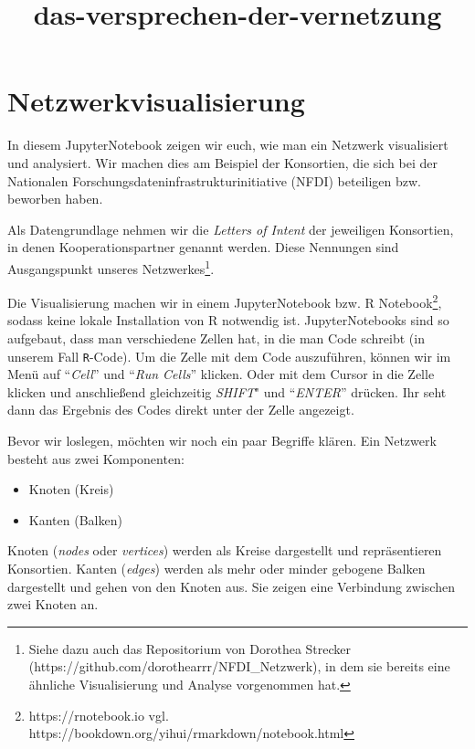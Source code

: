 \documentclass[11pt]{article}
\title{das-versprechen-der-vernetzung}
\providecommand{\tightlist}{%
      \setlength{\itemsep}{0pt}\setlength{\parskip}{0pt}}
\begin{document}
    
    \maketitle
    
    

    
    \hypertarget{netzwerkvisualisierung}{%
\section{Netzwerkvisualisierung}\label{netzwerkvisualisierung}}

In diesem JupyterNotebook zeigen wir euch, wie man ein Netzwerk
visualisiert und analysiert. Wir machen dies am Beispiel der Konsortien,
die sich bei der Nationalen Forschungsdateninfrastrukturinitiative
(NFDI) beteiligen bzw. beworben haben.

Als Datengrundlage nehmen wir die \emph{Letters of Intent} der
jeweiligen Konsortien, in denen Kooperationspartner genannt werden.
Diese Nennungen sind Ausgangspunkt unseres Netzwerkes\footnote{Siehe
  dazu auch das Repositorium von Dorothea Strecker
  (https://github.com/dorothearrr/NFDI\_Netzwerk), in dem sie bereits
  eine ähnliche Visualisierung und Analyse vorgenommen hat.}.

Die Visualisierung machen wir in einem JupyterNotebook bzw. R
Notebook\footnote{https://rnotebook.io vgl.
  https://bookdown.org/yihui/rmarkdown/notebook.html}, sodass keine
lokale Installation von R notwendig ist. JupyterNotebooks sind so
aufgebaut, dass man verschiedene Zellen hat, in die man Code schreibt
(in unserem Fall \texttt{R}-Code). Um die Zelle mit dem Code
auszuführen, können wir im Menü auf ``\emph{Cell}'' und ``\emph{Run
Cells}'' klicken. Oder mit dem Cursor in die Zelle klicken und
anschließend gleichzeitig \emph{SHIFT}" und ``\emph{ENTER}'' drücken.
Ihr seht dann das Ergebnis des Codes direkt unter der Zelle angezeigt.

    Bevor wir loslegen, möchten wir noch ein paar Begriffe klären. Ein
Netzwerk besteht aus zwei Komponenten:

\begin{itemize}
\tightlist
\item
  Knoten (Kreis)
\item
  Kanten (Balken)
\end{itemize}

Knoten (\emph{nodes} oder \emph{vertices}) werden als Kreise dargestellt
und repräsentieren Konsortien. Kanten (\emph{edges}) werden als mehr
oder minder gebogene Balken dargestellt und gehen von den Knoten aus.
Sie zeigen eine Verbindung zwischen zwei Knoten an.
\end{document}
